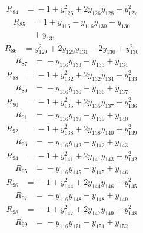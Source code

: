 \begin{align*}
R_{84} &={} -1 +y_{126}^{2} +2y_{126}y_{128} +y_{127}^{2}
\end{align*}
\begin{align*}
R_{85} &={} 1 +y_{116} -y_{116}y_{130} -y_{130} \\
 &{} +y_{131}
\end{align*}
\begin{align*}
R_{86} &={} y_{129}^{2} +2y_{129}y_{131} -2y_{130} +y_{130}^{2}
\end{align*}
\begin{align*}
R_{87} &={} -y_{116}y_{133} -y_{133} +y_{134}
\end{align*}
\begin{align*}
R_{88} &={} -1 +y_{132}^{2} +2y_{132}y_{134} +y_{133}^{2}
\end{align*}
\begin{align*}
R_{89} &={} -y_{116}y_{136} -y_{136} +y_{137}
\end{align*}
\begin{align*}
R_{90} &={} -1 +y_{135}^{2} +2y_{135}y_{137} +y_{136}^{2}
\end{align*}
\begin{align*}
R_{91} &={} -y_{116}y_{139} -y_{139} +y_{140}
\end{align*}
\begin{align*}
R_{92} &={} -1 +y_{138}^{2} +2y_{138}y_{140} +y_{139}^{2}
\end{align*}
\begin{align*}
R_{93} &={} -y_{116}y_{142} -y_{142} +y_{143}
\end{align*}
\begin{align*}
R_{94} &={} -1 +y_{141}^{2} +2y_{141}y_{143} +y_{142}^{2}
\end{align*}
\begin{align*}
R_{95} &={} -y_{116}y_{145} -y_{145} +y_{146}
\end{align*}
\begin{align*}
R_{96} &={} -1 +y_{144}^{2} +2y_{144}y_{146} +y_{145}^{2}
\end{align*}
\begin{align*}
R_{97} &={} -y_{116}y_{148} -y_{148} +y_{149}
\end{align*}
\begin{align*}
R_{98} &={} -1 +y_{147}^{2} +2y_{147}y_{149} +y_{148}^{2}
\end{align*}
\begin{align*}
R_{99} &={} -y_{116}y_{151} -y_{151} +y_{152}
\end{align*}
